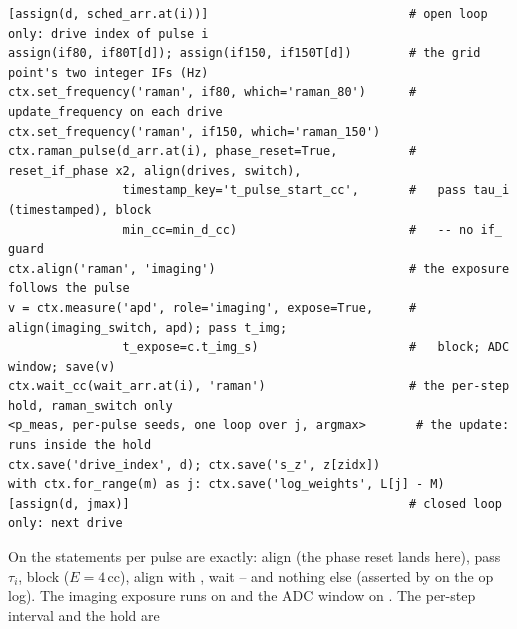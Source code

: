 \begin{lstlisting}[style=py]
[assign(d, sched_arr.at(i))]                            # open loop only: drive index of pulse i
assign(if80, if80T[d]); assign(if150, if150T[d])        # the grid point's two integer IFs (Hz)
ctx.set_frequency('raman', if80, which='raman_80')      # update_frequency on each drive
ctx.set_frequency('raman', if150, which='raman_150')
ctx.raman_pulse(d_arr.at(i), phase_reset=True,          # reset_if_phase x2, align(drives, switch),
                timestamp_key='t_pulse_start_cc',       #   pass tau_i (timestamped), block
                min_cc=min_d_cc)                        #   -- no if_ guard
ctx.align('raman', 'imaging')                           # the exposure follows the pulse
v = ctx.measure('apd', role='imaging', expose=True,     # align(imaging_switch, apd); pass t_img;
                t_expose=c.t_img_s)                     #   block; ADC window; save(v)
ctx.wait_cc(wait_arr.at(i), 'raman')                    # the per-step hold, raman_switch only
<p_meas, per-pulse seeds, one loop over j, argmax>       # the update: runs inside the hold
ctx.save('drive_index', d); ctx.save('s_z', z[zidx])
with ctx.for_range(m) as j: ctx.save('log_weights', L[j] - M)
[assign(d, jmax)]                                       # closed loop only: next drive
\end{lstlisting}

On  the statements per pulse are exactly: align (the
phase reset lands here), pass $\tau_i$, block ($E = 4$\,cc), align with
, wait -- and nothing else (asserted by
 on the op log). The imaging exposure
runs on  and the ADC window on . The per-step
interval and the hold are

